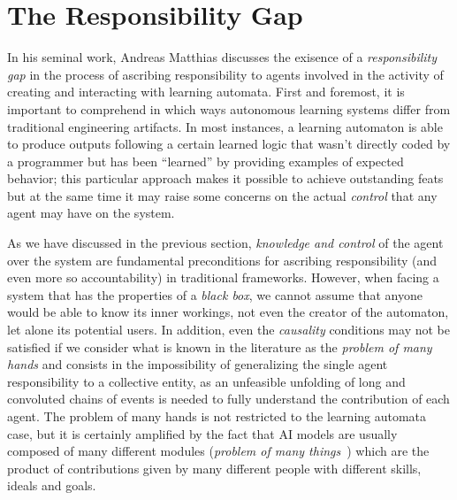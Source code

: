 \section{The Responsibility Gap}\label{sec:responsibilitygap}

In his seminal work, Andreas Matthias discusses the exisence of a \textit{responsibility gap} \parencite{MATTRG} in the process of ascribing responsibility to agents involved in the activity of creating and interacting with learning automata.
First and foremost, it is important to comprehend in which ways autonomous learning systems differ from traditional engineering artifacts.
In most instances, a learning automaton is able to produce outputs following a certain learned logic that wasn't directly coded by a programmer but has been ``learned'' by providing examples of expected behavior; this particular approach makes it possible to achieve outstanding feats but at the same time it may raise some concerns on the actual \textit{control} that any agent may have on the system.

As we have discussed in the previous section, \textit{knowledge and control} of the agent over the system are fundamental preconditions for ascribing responsibility (and even more so accountability) in traditional frameworks.
However, when facing a system that has the properties of a \textit{black box}, we cannot assume that anyone would be able to know its inner workings, not even the creator of the automaton, let alone its potential users.
In addition, even the \textit{causality} conditions may not be satisfied if we consider what is known in the literature as the \textit{problem of many hands} \parencite{POPOM, COEAIR, NISAIA} and consists in the impossibility of generalizing the single agent responsibility to a collective entity, as an unfeasible unfolding of long and convoluted chains of events is needed to fully understand the contribution of each agent.
The problem of many hands is not restricted to the learning automata case, but it is certainly amplified by the fact that AI models are usually composed of many different modules (\textit{problem of many things}~\cite{COEAIR}) which are the product of contributions given by many different people with different skills, ideals and goals.

